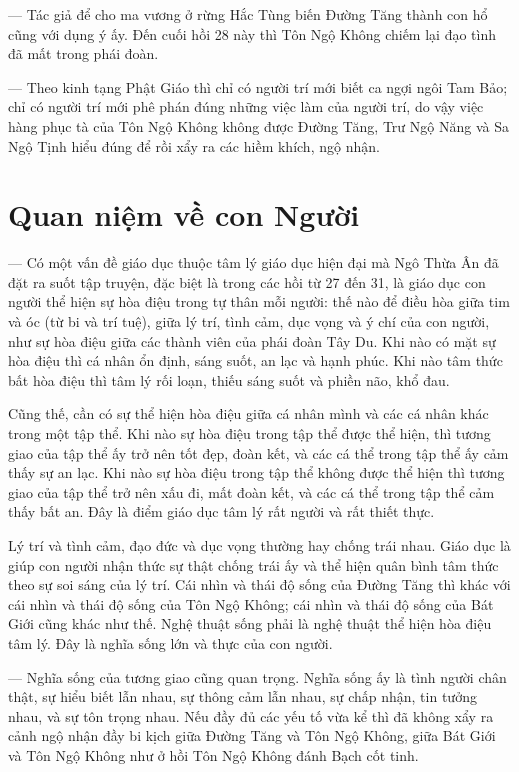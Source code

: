 --- Tác giả để cho ma vương ở rừng Hắc Tùng biến Đường Tăng thành con hổ cũng với dụng ý ấy. Đến cuối hồi 28 này thì Tôn Ngộ Không chiếm lại đạo tình đã mất trong phái đoàn.

--- Theo kinh tạng Phật Giáo thì chỉ có người trí mới biết ca ngợi ngôi Tam Bảo; chỉ có người trí mới phê phán đúng những việc làm của người trí, do vậy việc hàng phục tà của Tôn Ngộ Không không được Đường Tăng, Trư Ngộ Năng và Sa Ngộ Tịnh hiểu đúng để rồi xẩy ra các hiềm khích, ngộ nhận.

\section{Quan niệm về con Người} %
\label{sec:27_28_con_nguoi}

--- Có một vấn đề giáo dục thuộc tâm lý giáo dục hiện đại mà Ngô Thừa Ân đã đặt ra suốt tập truyện, đặc biệt là trong các hồi từ 27 đến 31, là giáo dục con người thể hiện sự hòa điệu trong tự thân mỗi người: thế nào để điều hòa giữa tim và óc (từ bi và trí tuệ), giữa lý trí, tình cảm, dục vọng và ý chí của con người, như sự hòa điệu giữa các thành viên của phái đoàn Tây Du. Khi nào có mặt sự hòa điệu thì cá nhân ổn định, sáng suốt, an lạc và hạnh phúc. Khi nào tâm thức bất hòa điệu thì tâm lý rối loạn, thiếu sáng suốt và phiền não, khổ đau.

Cũng thế, cần có sự thể hiện hòa điệu giữa cá nhân mình và các cá nhân khác trong một tập thể. Khi nào sự hòa điệu trong tập thể được thể hiện, thì tương giao của tập thể ấy trở nên tốt đẹp, đoàn kết, và các cá thể trong tập thể ấy cảm thấy sự an lạc. Khi nào sự hòa điệu trong tập thể không được thể hiện thì tương giao của tập thể trở nên xấu đi, mất đoàn kết, và các cá thể trong tập thể cảm thấy bất an. Đây là điểm giáo dục tâm lý rất người và rất thiết thực.

Lý trí và tình cảm, đạo đức và dục vọng thường hay chống trái nhau. Giáo dục là giúp con người nhận thức sự thật chống trái ấy và thể hiện quân bình tâm thức theo sự soi sáng của lý trí. Cái nhìn và thái độ sống của Đường Tăng thì khác với cái nhìn và thái độ sống của Tôn Ngộ Không; cái nhìn và thái độ sống của Bát Giới cũng khác như thế. Nghệ thuật sống phải là nghệ thuật thể hiện hòa điệu tâm lý. Đây là nghĩa sống lớn và thực của con người.

--- Nghĩa sống của tương giao cũng quan trọng. Nghĩa sống ấy là tình người chân thật, sự hiểu biết lẫn nhau, sự thông cảm lẫn nhau, sự chấp nhận, tin tưởng nhau, và sự tôn trọng nhau. Nếu đầy đủ các yếu tố vừa kể thì đã không xẩy ra cảnh ngộ nhận đầy bi kịch giữa Đường Tăng và Tôn Ngộ Không, giữa Bát Giới và Tôn Ngộ Không như ở hồi Tôn Ngộ Không đánh Bạch cốt tinh.

